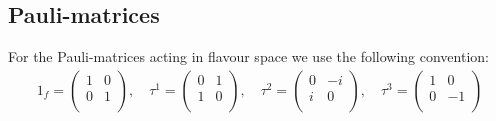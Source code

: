 \subsection{Pauli-matrices}

For the Pauli-matrices acting in flavour space we use the following
convention: 
\[
\begin{split}
  1_f = 
  \begin{pmatrix}
    1 & 0 \\
    0 & 1 \\
  \end{pmatrix},\quad
  \tau^1 =
  \begin{pmatrix}
    0 & 1 \\
    1 & 0 \\
  \end{pmatrix},\quad
  \tau^2 = 
  \begin{pmatrix}
    0 & -i \\
    i & 0 \\
  \end{pmatrix},\quad
  \tau^3 = 
  \begin{pmatrix}
    1 & 0 \\
    0 & -1 \\
  \end{pmatrix}
\end{split}
\]

\endinput

